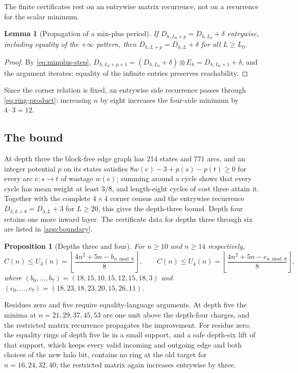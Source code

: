 \documentclass[10pt]{article}
\newtheorem{proposition}[theorem]{Proposition}
\newtheorem{lemma}[theorem]{Lemma}
\theoremstyle{remark}
\begin{document}
The finite certificates rest on an entrywise matrix recurrence, not on a
recurrence for the scalar minimum.

\begin{lemma}[Propagation of a min-plus period]\label{lem:minplus-period}
If $D_{h,L_0+p}=D_{h,L_0}+\delta$ entrywise, including equality of the
$+\infty$ pattern, then $D_{h,L+p}=D_{h,L}+\delta$ for all $L\ge L_0$.
\end{lemma}

\begin{proof}
By \eqref{eq:minplus-step},
$D_{h,L_0+p+1}=(D_{h,L_0}+\delta)\otimes E_h=D_{h,L_0+1}+\delta$, and the
argument iterates; equality of the infinite entries preserves reachability.
\end{proof}

Since the corner relation is fixed, an entrywise side recurrence passes through
\eqref{eq:ring-product}: increasing $n$ by eight increases the four-side minimum
by $4\cdot3=12$.

\subsection{The bound}

At depth three the block-free edge graph has 214 states and 771 arcs, and an
integer potential $p$ on its states satisfies $8w(e)-3+p(s)-p(t)\ge0$ for every
arc $e:s\to t$ of wastage $w(e)$; summing around a cycle shows that every cycle
has mean weight at least $3/8$, and length-eight cycles of cost three attain it.
Together with the complete $4\times4$ corner census and the entrywise recurrence
$D_{3,L+8}=D_{3,L}+3$ for $L\ge20$, this gives the depth-three bound.  Depth
four retains one more inward layer.  The certificate data for depths three
through six are listed in \cref{app:boundary}.

\begin{proposition}[Depths three and four]\label{prop:U4}
For $n\ge10$ and $n\ge14$ respectively,
\[
 C(n)\le U_3(n)=\left\lfloor\frac{4n^2+5n-b_{n\bmod8}}8\right\rfloor,
 \qquad
 C(n)\le U_4(n)=\left\lfloor\frac{4n^2+5n-c_{n\bmod8}}8\right\rfloor,
\]
where $(b_0,\ldots,b_7)=(18,15,10,15,12,15,18,3)$ and
$(c_0,\ldots,c_7)=(18,23,18,23,20,15,26,11)$.
\end{proposition}

Residues zero and five require equality-language arguments.  At depth five the
minima at $n=21,29,37,45,53$ are one unit above the depth-four charges, and the
restricted matrix recurrence propagates the improvement.  For residue zero, the
equality rings of depth five lie in a small support, and a safe depth-six lift
of that support, which keeps every valid incoming and outgoing edge and both
choices of the new halo bit, contains no ring at the old target for
$n=16,24,32,40$; the restricted matrix again increases entrywise by three.
\end{document}

